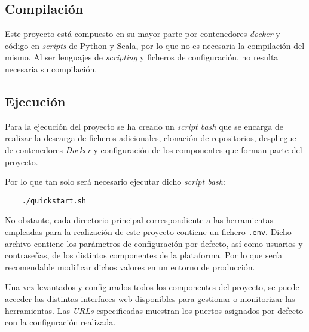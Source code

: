 \subsection{Compilación}

Este proyecto está compuesto en su mayor parte por contenedores \textit{docker} y código en \textit{scripts} de Python y Scala, por lo que no es necesaria la compilación del mismo. Al ser lenguajes de \textit{scripting} y ficheros de configuración, no resulta necesaria su compilación.

\subsection{Ejecución}

Para la ejecución del proyecto se ha creado un \textit{script bash} que se encarga de realizar la descarga de ficheros adicionales, clonación de repositorios, despliegue de contenedores \textit{Docker} y configuración de los componentes que forman parte del proyecto.

Por lo que tan solo será necesario ejecutar dicho \textit{script bash}:

\begin{verbatim}
    ./quickstart.sh
\end{verbatim}

No obstante, cada directorio principal correspondiente a las herramientas empleadas para la realización de este proyecto contiene un fichero \texttt{.env}. Dicho archivo contiene los parámetros de configuración por defecto, así como usuarios y contraseñas, de los distintos componentes de la plataforma. Por lo que sería recomendable modificar dichos valores en un entorno de producción.

Una vez levantados y configurados todos los componentes del proyecto, se puede acceder las distintas interfaces web disponibles para gestionar o monitorizar las herramientas. Las \textit{URLs} especificadas muestran los puertos asignados por defecto con la configuración realizada.

